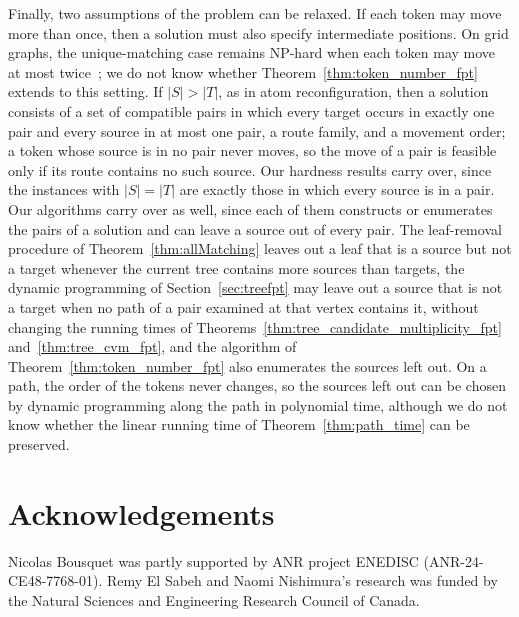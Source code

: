\documentclass[a4paper,USenglish,thm-restate]{lipics-v2021}
\theoremstyle{problemstyle}
\begin{document}
Finally, two assumptions of the problem can be relaxed. If each token may
move more than once, then a solution must also specify intermediate
positions. On grid graphs, the unique-matching case remains
\textsf{NP}-hard when each token may move at most
twice~\cite{VanDerHorst2026Squares}; we do not know whether
Theorem~\ref{thm:token_number_fpt} extends to this setting. If
$|S| > |T|$, as in atom reconfiguration, then a solution consists of a set of compatible pairs in
which every target occurs in exactly one pair and every source in at most
one pair, a route family, and a movement order; a token whose source is in
no pair never moves, so the move of a pair is feasible only if its route
contains no such source. Our hardness results carry over, since the
instances with $|S| = |T|$ are exactly those in which every source is in a
pair. Our algorithms carry over as well, since each of them constructs or
enumerates the pairs of a solution and can leave a source out of every
pair. The leaf-removal procedure of Theorem~\ref{thm:allMatching} leaves
out a leaf that is a source but not a target whenever the current tree
contains more sources than targets, the dynamic programming of
Section~\ref{sec:treefpt} may leave out a source that is not a target when
no path of a pair examined at that vertex contains it, without changing
the running times of Theorems~\ref{thm:tree_candidate_multiplicity_fpt}
and~\ref{thm:tree_cvm_fpt}, and the algorithm of
Theorem~\ref{thm:token_number_fpt} also enumerates the sources left out.
On a path, the order of the tokens never changes, so the sources left out
can be chosen by dynamic programming along the path in polynomial time,
although we do not know whether the linear running time of
Theorem~\ref{thm:path_time} can be preserved.

\section*{Acknowledgements}
Nicolas Bousquet was partly supported by ANR project ENEDISC
(ANR-24-CE48-7768-01). Remy El Sabeh and Naomi Nishimura's research was
funded by the Natural Sciences and Engineering Research Council of Canada.
\end{document}
